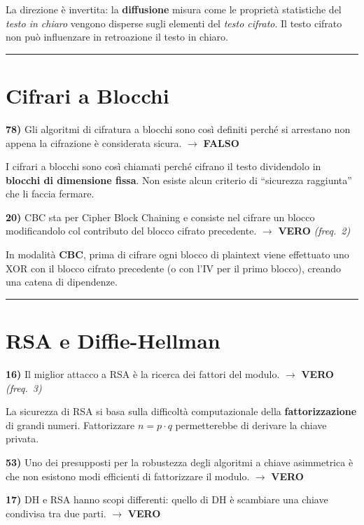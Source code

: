 \documentclass[12pt, a4paper]{report}
\newcommand{\vero}{\textcolor{verdeanswer}{\textbf{VERO}}}
\newcommand{\falso}{\textcolor{rossoanswer}{\textbf{FALSO}}}
\newcommand{\freq}[1]{\textcolor{freqcolor}{\textit{(freq.\ #1)}}}
\begin{document}
\medskip
\noindent La direzione è invertita: la \textbf{diffusione} misura come le proprietà statistiche del \textit{testo in chiaro} vengono disperse sugli elementi del \textit{testo cifrato}. Il testo cifrato non può influenzare in retroazione il testo in chiaro.

\noindent\rule{\textwidth}{0.4pt}

\section{Cifrari a Blocchi}

\noindent\textbf{78)} Gli algoritmi di cifratura a blocchi sono così definiti perché si arrestano non appena la cifrazione è considerata sicura. $\to$ \falso{}

\medskip
\noindent I cifrari a blocchi sono così chiamati perché cifrano il testo dividendolo in \textbf{blocchi di dimensione fissa}. Non esiste alcun criterio di ``sicurezza raggiunta'' che li faccia fermare.

\medskip
\noindent\textbf{20)} CBC sta per Cipher Block Chaining e consiste nel cifrare un blocco modificandolo col contributo del blocco cifrato precedente. $\to$ \vero{} \freq{2}

\medskip
\noindent In modalità \textbf{CBC}, prima di cifrare ogni blocco di plaintext viene effettuato uno XOR con il blocco cifrato precedente (o con l'IV per il primo blocco), creando una catena di dipendenze.

\noindent\rule{\textwidth}{0.4pt}

\section{RSA e Diffie-Hellman}

\noindent\textbf{16)} Il miglior attacco a RSA è la ricerca dei fattori del modulo. $\to$ \vero{} \freq{3}

\medskip
\noindent La sicurezza di RSA si basa sulla difficoltà computazionale della \textbf{fattorizzazione} di grandi numeri. Fattorizzare $n = p \cdot q$ permetterebbe di derivare la chiave privata.

\medskip
\noindent\textbf{53)} Uno dei presupposti per la robustezza degli algoritmi a chiave asimmetrica è che non esistono modi efficienti di fattorizzare il modulo. $\to$ \vero{}

\medskip
\noindent\textbf{17)} DH e RSA hanno scopi differenti: quello di DH è scambiare una chiave condivisa tra due parti. $\to$ \vero{}
\end{document}
